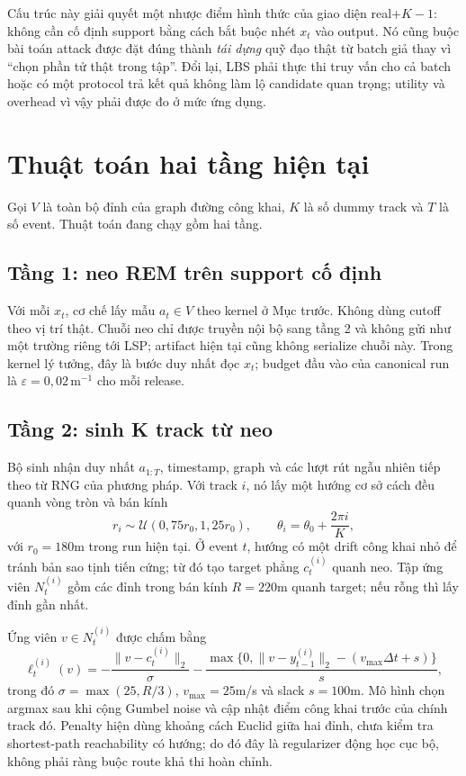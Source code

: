 \documentclass[12pt,a4paper,oneside]{report}
\begin{document}
Cấu trúc này giải quyết một nhược điểm hình thức của giao diện real+$K-1$: không cần cố định support bằng cách bắt buộc nhét $x_t$ vào output. Nó cũng buộc bài toán attack được đặt đúng thành \emph{tái dựng} quỹ đạo thật từ batch giả thay vì ``chọn phần tử thật trong tập''. Đổi lại, LBS phải thực thi truy vấn cho cả batch hoặc có một protocol trả kết quả không làm lộ candidate quan trọng; utility và overhead vì vậy phải được đo ở mức ứng dụng.

\section{Thuật toán hai tầng hiện tại}

Gọi $V$ là toàn bộ đỉnh của graph đường công khai, $K$ là số dummy track và $T$ là số event. Thuật toán đang chạy gồm hai tầng.

\subsection{Tầng 1: neo REM trên support cố định}

Với mỗi $x_t$, cơ chế lấy mẫu $a_t\in V$ theo kernel ở Mục trước. Không dùng cutoff theo vị trí thật. Chuỗi neo chỉ được truyền nội bộ sang tầng 2 và không gửi như một trường riêng tới LSP; artifact hiện tại cũng không serialize chuỗi này. Trong kernel lý tưởng, đây là bước duy nhất đọc $x_t$; budget đầu vào của canonical run là $\varepsilon=0{,}02\,\mathrm{m}^{-1}$ cho mỗi release.

\subsection{Tầng 2: sinh K track từ neo}

Bộ sinh nhận duy nhất $a_{1:T}$, timestamp, graph và các lượt rút ngẫu nhiên tiếp theo từ RNG của phương pháp. Với track $i$, nó lấy một hướng cơ sở cách đều quanh vòng tròn và bán kính
\[
r_i\sim\mathcal U(0{,}75r_0,1{,}25r_0),
\qquad \theta_i=\theta_0+\frac{2\pi i}{K},
\]
với $r_0=180$m trong run hiện tại. Ở event $t$, hướng có một drift công khai nhỏ để tránh bản sao tịnh tiến cứng; từ đó tạo target phẳng $c_t^{(i)}$ quanh neo. Tập ứng viên $N_t^{(i)}$ gồm các đỉnh trong bán kính $R=220$m quanh target; nếu rỗng thì lấy đỉnh gần nhất.

Ứng viên $v\in N_t^{(i)}$ được chấm bằng
\[
\ell_t^{(i)}(v)
=-\frac{\|v-c_t^{(i)}\|_2}{\sigma}
-\frac{\max\{0,\|v-y_{t-1}^{(i)}\|_2-(v_{\max}\Delta t+s)\}}{s},
\]
trong đó $\sigma=\max(25,R/3)$, $v_{\max}=25$m/s và slack $s=100$m. Mô hình chọn argmax sau khi cộng Gumbel noise và cập nhật điểm công khai trước của chính track đó. Penalty hiện dùng khoảng cách Euclid giữa hai đỉnh, chưa kiểm tra shortest-path reachability có hướng; do đó đây là regularizer động học cục bộ, không phải ràng buộc route khả thi hoàn chỉnh.
\end{document}

